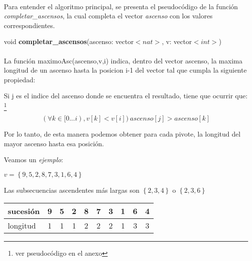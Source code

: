 \paragraph{}
Para entender el algoritmo principal, se presenta el pseudocódigo de la función \textit{completar\_ascensos}, la cual completa el vector \textit{ascenso} con los valores correspondientes.

\incmargin{1em}
\linesnumbered
{}

\begin{algorithm}[H]
	void  \textbf{completar\_ascensos}(ascenso: vector$<nat>$, v: vector$<int>$)\\
	\BlankLine		
	\BlankLine		
	\BlankLine		
\end{algorithm}
	

\paragraph{}
La función maximoAsc(ascenso,v,i) indica, dentro del vector ascenso, la maxima longitud de un ascenso hasta la posicion i-1 del vector tal que cumpla la siguiente propiedad:

\vspace*{1cm}

Si j es el indice del ascenso donde se encuentra el resultado, tiene que ocurrir que: \footnote{ver pseudocódigo en el anexo}

$$(\forall k \in [0...i) , v[k]<v[i]) \  ascenso[j] > ascenso[k]$$


Por lo tanto, de esta manera podemos obtener para cada pivote, la longitud del mayor ascenso hasta esa posición.

\vspace*{1cm}
Veamos un \textit{ejemplo}:

$v = \left\lbrace 9,5,2,8,7,3,1,6,4\right\rbrace$ 

Las subsecuencias ascendentes más largas son $\left\lbrace 2,3,4\right\rbrace$ o $\left\lbrace 2,3,6\right\rbrace$

\begin{center}
   \begin{tabular}{| l | c | c |c |c |c |c |c |c |c | }
     \hline
     sucesión & 9 & 5 & 2 & 8 & 7 & 3 & 1 & 6 & 4 \\ \hline
     longitud & 1& 1& 1& 2& 2& 2& 1 &3 & 3 \\ \hline
     
     \hline
   \end{tabular}
 \end{center}

